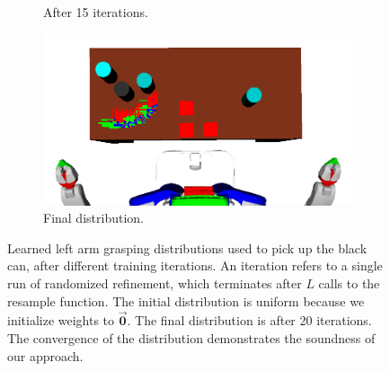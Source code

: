 \begin{figure}
\begin{subfigure}[b]{0.48\linewidth}
    \caption{After 15 iterations.}
  \end{subfigure}
  \begin{subfigure}[b]{0.48\linewidth}
    \includegraphics[width=\textwidth]{images/learng20.png}
    \caption{Final distribution.}
  \end{subfigure}
  \caption{Learned left arm grasping distributions used to
pick up the black can, after different training iterations.
An iteration refers to a single run of randomized refinement,
which terminates after $L$ calls to the resample function. The
initial distribution is uniform because we initialize weights to $\vec{\mathbf{0}}$.
The final distribution is after 20 iterations. The convergence of
the distribution demonstrates the soundness of our approach.}
  \label{fig:training}
\end{figure}

